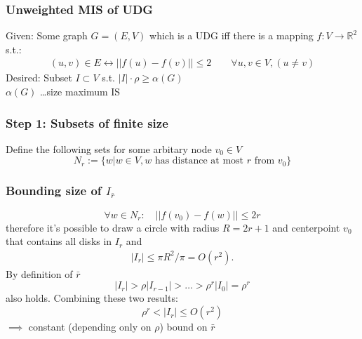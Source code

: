 \documentclass{beamer}
\begin{document}
\begin{frame}
\frametitle{Unweighted MIS of UDG}

Given: Some graph $G = (E,V)$ which is a UDG iff there is a mapping $f: V \rightarrow \mathbb R^2$ s.t.:
\begin{align*}(u,v) \in E \leftrightarrow ||f(u) - f(v) || \leq 2 \qquad \forall u,v \in V, (u\neq v)\end{align*}
Desired: Subset $I \subset V$ s.t. $|I|\cdot \rho \geq \alpha(G)$\\ $\alpha(G)$ \ldots size maximum IS \\[1em]
\end{frame}

\newcommand{\vv}{v_0}
\begin{frame}
\frametitle{Step 1: Subsets of finite size}

Define the following sets for some arbitary node $\vv\in V$ 
\begin{equation*}
N_r := \{w| w\in V, w \text{ has distance at most $r$ from $\vv$}\}
\end{equation*}
\end{frame}

\begin{frame}
\frametitle{Bounding size of $I_{\bar r}$}
\begin{equation*}
\forall w\in N_r: \quad ||f(\vv) - f(w)|| \leq 2r
\end{equation*}
therefore it's possible to draw a circle with radius $R = 2r +1$ and centerpoint $\vv$ that contains all disks in $I_r$ and
\begin{align*}
|I_r| \leq \pi R^2 / \pi = O(r^2).
\end{align*}
By definition of $\bar r$ 
\begin{equation*}
|I_r| > \rho |I_{r-1}| > \ldots > \rho^r |I_0| = \rho^r
\end{equation*}also holds. Combining these two results:
\begin{equation*}
\rho^r < |I_r| \leq O(r^2)
\end{equation*} $\implies$ constant (depending only on $\rho$) bound on $\bar r$
\end{frame}
\end{document}
